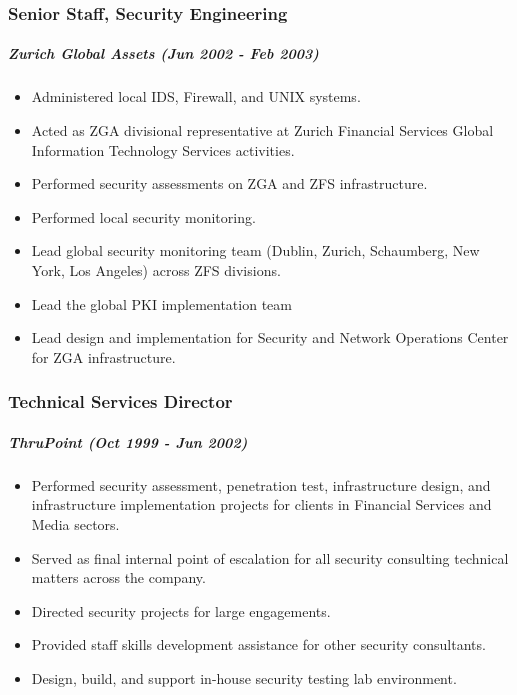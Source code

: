 \documentclass[10pt,]{article}
\providecommand{\tightlist}{%
  \setlength{\itemsep}{0pt}\setlength{\parskip}{0pt}}
\let\oldsubparagraph\subparagraph
\renewcommand{\subparagraph}[1]{\oldsubparagraph{#1}\mbox{}}
\begin{document}
\subsubsection{Senior Staff, Security
Engineering}\label{senior-staff-security-engineering}

\subparagraph{\texorpdfstring{\emph{Zurich Global Assets} (Jun 2002 -
Feb
2003)}{Zurich Global Assets (Jun 2002 - Feb 2003)}}\label{zurich-global-assets-jun-2002---feb-2003}

\begin{itemize}
\tightlist
\item
  Administered local IDS, Firewall, and UNIX systems.
\item
  Acted as ZGA divisional representative at Zurich Financial Services
  Global Information Technology Services activities.
\item
  Performed security assessments on ZGA and ZFS infrastructure.
\item
  Performed local security monitoring.
\item
  Lead global security monitoring team (Dublin, Zurich, Schaumberg, New
  York, Los Angeles) across ZFS divisions.
\item
  Lead the global PKI implementation team
\item
  Lead design and implementation for Security and Network Operations
  Center for ZGA infrastructure.
\end{itemize}

\subsubsection{Technical Services
Director}\label{technical-services-director}

\subparagraph{\texorpdfstring{\emph{ThruPoint} (Oct 1999 - Jun
2002)}{ThruPoint (Oct 1999 - Jun 2002)}}\label{thrupoint-oct-1999---jun-2002}

\begin{itemize}
\tightlist
\item
  Performed security assessment, penetration test, infrastructure
  design, and infrastructure implementation projects for clients in
  Financial Services and Media sectors.
\item
  Served as final internal point of escalation for all security
  consulting technical matters across the company.
\item
  Directed security projects for large engagements.
\item
  Provided staff skills development assistance for other security
  consultants.
\item
  Design, build, and support in-house security testing lab environment.
\end{itemize}
\end{document}

